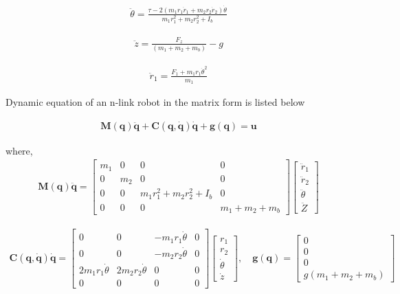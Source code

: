 \documentclass{UoNMCHA}
\numberwithin{equation}{section}
\begin{document}
	\begin{align}
\ddot{\theta}=\frac{\tau-2\left(m_{1} r_{1} \dot{r}_{1}+m_{2} r_{2} \dot{r}_{2}\right) \dot{\theta}}{m_{1} r_{1}^{2}+m_{2} r_{2}^{2}+I_{b}}
\end{align}

	\begin{align}
\ddot{z}=\frac{F_{z}}{\left(m_{1}+m_{2}+m_{b}\right)}-g
\end{align}

	\begin{align}
	\ddot{r}_{1}=\frac{F_{1}+m_{1} r_{1} \dot{\theta}^{2}}{m_{1}}
\end{align}

Dynamic equation of an n-link robot in the matrix form is listed below

\begin{align}
\boldsymbol{M}(\boldsymbol{q}) \ddot{\boldsymbol{q}}+\boldsymbol{C}(\boldsymbol{q}, \dot{\boldsymbol{q}}) \dot{\boldsymbol{q}}+\boldsymbol{g}(\boldsymbol{q})=\boldsymbol{u}
\end{align}

where,
\begin{align}
\boldsymbol{M(q) \ddot{q}}=\left[\begin{array}{cccc}
	m_{1} & 0 & 0 & 0 \\
	0 & m_{2} & 0 & 0 \\
	0 & 0 & m_{1} r_{1}^{2}+m_{2} r_{2}^{2}+I_{b} & 0 \\
	0 & 0 & 0 & m_{1}+m_{2}+m_{b}
\end{array}\right]\left[\begin{array}{c}
	\ddot{r}_{1} \\
	\ddot{r}_{2} \\
	\ddot{\theta} \\
	\ddot{Z}
\end{array}\right]
\end{align}

\begin{align}
\boldsymbol{C(q, \dot{q}) \dot{q}}=\left[\begin{array}{cccc}
	0 & 0 & -m_{1} r_{1} \dot{\theta} & 0 \\
	0 & 0 & -m_{2} r_{2} \dot{\theta} & 0 \\
	2 m_{1} r_{1} \dot{\theta} & 2 m_{2} r_{2} \dot{\theta} & 0 & 0 \\
	0 & 0 & 0 & 0
\end{array}\right]\left[\begin{array}{c}
	r_{1} \\
	r_{2} \\
	\dot{\theta} \\
	\dot{z}
\end{array}\right], \quad \boldsymbol{g(q)}=\left[\begin{array}{c}
	0 \\
	0 \\
	0 \\
	g\left(m_{1}+m_{2}+m_{b}\right)
\end{array}\right]
\end{align}
\end{document}
